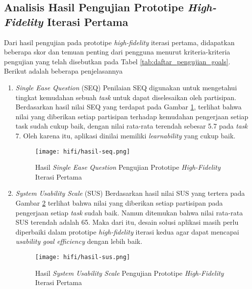 \newpage

\subsection{Analisis Hasil Pengujian Prototipe \textit{High-Fidelity} Iterasi Pertama}
\label{subsec:test_1_analisis}

Dari hasil pengujian pada prototipe \textit{high-fidelity} iterasi pertama, didapatkan beberapa skor dan temuan penting dari pengguna menurut kriteria-kriteria pengujian yang telah disebutkan pada Tabel \ref{tab:daftar_pengujian_goals}. Berikut adalah beberapa penjelasannya

\begin{enumerate}
  \item \textit{Single Ease Question} (SEQ)
  \subitem  Penilaian SEQ digunakan untuk mengetahui tingkat kemudahan sebuah \textit{task} untuk dapat diselesaikan oleh partisipan. Berdasarkan hasil nilai SEQ yang terdapat pada Gambar \ref{img:seq_1}, terlihat bahwa nilai yang diberikan setiap partisipan terhadap kemudahan pengerjaan setiap task sudah cukup baik, dengan nilai rata-rata terendah sebesar 5.7 pada \textit{task} 7. Oleh karena itu, aplikasi dinilai memiliki \textit{learnability} yang cukup baik. 

  \begin{figure}[h]
    \centering
    \texttt{[image: hifi/hasil-seq.png]}
    \caption{Hasil \textit{Single Ease Question} Pengujian Prototipe \textit{High-Fidelity} Iterasi Pertama}
    \label{img:seq_1}
  \end{figure}
  \FloatBarrier

  \item \textit{System Usability Scale} (SUS)
  \subitem  Berdasarkan hasil nilai SUS yang tertera pada Gambar \ref{img:sus_1} terlihat bahwa nilai yang diberikan setiap partisipan pada pengerjaan setiap \textit{task} sudah baik. Namun ditemukan bahwa nilai rata-rata SUS terendah adalah 65. Maka dari itu, desain solusi aplikasi masih perlu diperbaiki dalam prototipe \textit{high-fidelity} iterasi kedua agar dapat mencapai \textit{usability goal efficiency} dengan lebih baik. 

  \begin{figure}[h]
    \centering
    \texttt{[image: hifi/hasil-sus.png]}
    \caption{Hasil \textit{System Usability Scale} Pengujian Prototipe \textit{High-Fidelity} Iterasi Pertama}
    \label{img:sus_1}
  \end{figure}
  \FloatBarrier


\end{enumerate}
